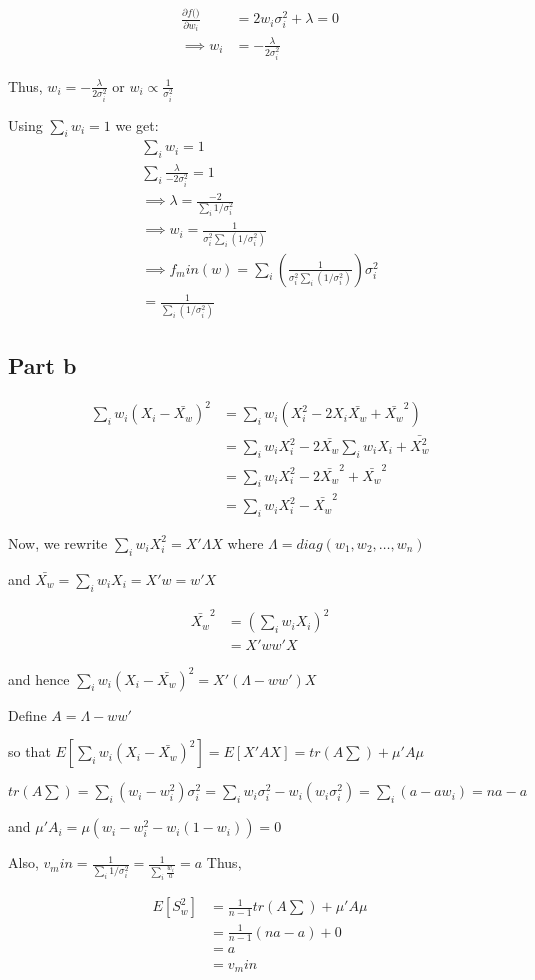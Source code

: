 \documentclass[a4paper]{article}
\begin{document}
\begin{align*}
\frac{\partial f(\mathbf)}{\partial w_i} &= 2w_i\sigma_i^2+\lambda =0\\
\implies w_i &= -\frac{\lambda}{2\sigma_i^2}
\end{align*}

Thus, $w_i = -\frac{\lambda}{2\sigma_i^2}$ or $w_i \propto \frac{1}{\sigma_i^2}$

Using $\sum_i w_i=1$  we get:
\begin{eqnarray*}
\sum_i w_i = 1\\
\sum_i \frac{\lambda}{-2\sigma_i^2} =1\\
\implies \lambda = \frac{-2}{\sum_i 1/\sigma_i^2 }\\
\implies w_i = \frac{1}{\sigma_i^2 \sum_i(1/\sigma_i^2)}\\
\implies f_min(w) = \sum_i (\frac{1}{\sigma_i^2 \sum_i(1/\sigma_i^2)}) \sigma_i^2\\
= \frac{1}{\sum_i(1/\sigma_i^2)}
\end{eqnarray*}


\subsection*{Part b}

\begin{align*}
\sum_i w_i (X_i-\bar{X_w})^2 &= \sum_i w_i(X_i^2-2X_i\bar{X_w}+\bar{X_w}^2)\\
&= \sum_i w_iX_i^2-2\bar{X_w}\sum_iw_iX_i+\bar{X_w^2}\\
&= \sum_i w_iX_i^2 -2\bar{X_w}^2+\bar{X_w}^2\\
&= \sum_i w_iX_i^2 -\bar{X_w}^2
\end{align*}

Now, we rewrite $\sum_i w_iX_i^2 = X'\Lambda X$ where $\Lambda = diag(w_1, w_2, \dots, w_n)$

and $\bar{X_w} = \sum_i w_iX_i = X'w = w'X$

\begin{align*}
\bar{X_w}^2 &= (\sum_i w_iX_i)^2\\
&=X'ww'X
\end{align*}

and hence $\sum_i w_i (X_i-\bar{X_w})^2=X'(\Lambda-ww')X$ 

Define $A=\Lambda-ww'$

so that $E[\sum_i w_i (X_i-\bar{X_w})^2] = E[X'AX]= tr(A\sum) + \mu'A\mu$

$tr(A\sum) = \sum_i(w_i-w_i^2)\sigma_i^2 = \sum_i w_i\sigma_i^2-w_i(w_i\sigma_i^2) = \sum_i (a-aw_i) = na-a$

and $\mu'A_i = \mu(w_i-w_i^2-w_i(1-w_i)) = 0 $ 

Also, $v_min = \frac{1}{\sum_i 1/\sigma_i^2} = \frac{1}{\sum_i \frac{w_i}{a}} = a $
\textit{}
Thus,

\begin{align*}
E[S_w^2] &= \frac{1}{n-1} tr(A\sum) + \mu'A\mu\\
&= \frac{1}{n-1} (na-a) + 0\\
&=a\\
&= v_min
\end{align*}
\end{document}
